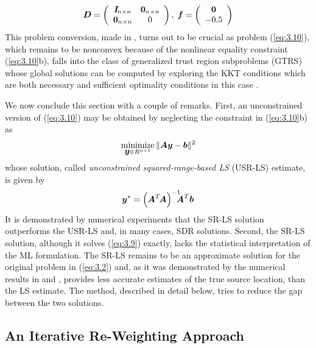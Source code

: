 \begin{equation}%
\nonumber
\BD=\left(\begin{array}{cc}
    \BI\!_{n\times n} & \BO_{n\times n} \\
    \BO_{n\times n} & 0
    \end{array} \right), \;
\Bf=\left(\begin{array}{c}\BO \\ -0.5 \end{array} \right)
\end{equation}
This problem conversion, made in \cite{BeckStLi}, turns out to be crucial as problem (\ref{eq:3.10}), which remains to be nonconvex because of the nonlinear equality constraint (\ref{eq:3.10}b), falls into the class of generalized trust region subproblems (GTRS) \cite{More, FortinWol}  whose global solutions can be computed by exploring the KKT conditions which are both necessary and sufficient optimality conditions in this case \cite{More}.

We now conclude this section with a couple of remarks. First, an unconstrained version of (\ref{eq:3.10}) may be obtained by neglecting the constraint in (\ref{eq:3.10}b) as
\begin{equation} \label{eq:3.12}%
\Min_{{\By} \in R^{n+1}} \|\BA\By-\Bb\|^2
\end{equation}
whose solution, called \textit{unconstrained squared-range-based LS }(USR-LS) estimate, is given by
\begin{equation} \label{eq:3.13}%
\By^*=\left(\BA^T\!\BA\right)^{-1}\!\!\!\!\BA^T\Bb
\end{equation}
It is demonstrated by numerical experiments \cite{BeckStLi} that the SR-LS solution outperforms the USR-LS and, in many cases, SDR solutions. Second, the SR-LS solution, although it solves (\ref{eq:3.9}) exactly, lacks the statistical interpretation of the ML formulation. The SR-LS remains to be an approximate solution for the original problem in (\ref{eq:3.2}) and, as it was demonstrated by the numerical results in \cite{BeckTeCh} and \cite{BeckGPS}, provides less accurate estimates of the true source location, than the LS estimate. The method, described in detail below, tries to reduce the gap between the two solutions.

\subsection{An Iterative Re-Weighting Approach}%


